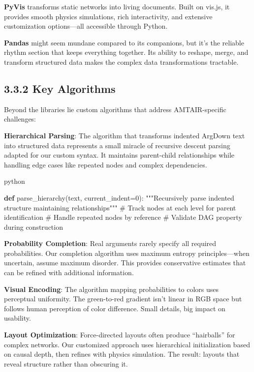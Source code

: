 \documentclass[
  11pt,
  letterpaper,
]{book}
\newenvironment{Shaded}{\begin{snugshade}}{\end{snugshade}}
\newcommand{\CommentTok}[1]{\textcolor[rgb]{0.37,0.37,0.37}{#1}}
\newcommand{\DecValTok}[1]{\textcolor[rgb]{0.68,0.00,0.00}{#1}}
\newcommand{\KeywordTok}[1]{\textcolor[rgb]{0.00,0.23,0.31}{\textbf{#1}}}
\newcommand{\NormalTok}[1]{\textcolor[rgb]{0.00,0.23,0.31}{#1}}
\newcommand{\OperatorTok}[1]{\textcolor[rgb]{0.37,0.37,0.37}{#1}}
\begin{document}
\textbf{PyVis} transforms static networks into living documents. Built
on vis.js, it provides smooth physics simulations, rich interactivity,
and extensive customization options---all accessible through Python.

\textbf{Pandas} might seem mundane compared to its companions, but it's
the reliable rhythm section that keeps everything together. Its ability
to reshape, merge, and transform structured data makes the complex data
transformations tractable.

\subsection{3.3.2 Key Algorithms}\label{sec-key-algorithms}

Beyond the libraries lie custom algorithms that address AMTAIR-specific
challenges:

\textbf{Hierarchical Parsing}: The algorithm that transforms indented
ArgDown text into structured data represents a small miracle of
recursive descent parsing adapted for our custom syntax. It maintains
parent-child relationships while handling edge cases like repeated nodes
and complex dependencies.

python

\begin{Shaded}
\begin{Highlighting}[]
\KeywordTok{def}\NormalTok{ parse\_hierarchy(text, current\_indent}\OperatorTok{=}\DecValTok{0}\NormalTok{):}
    \CommentTok{"""Recursively parse indented structure maintaining relationships"""}
    \CommentTok{\# Track nodes at each level for parent identification}
    \CommentTok{\# Handle repeated nodes by reference}
    \CommentTok{\# Validate DAG property during construction}
\end{Highlighting}
\end{Shaded}

\textbf{Probability Completion}: Real arguments rarely specify all
required probabilities. Our completion algorithm uses maximum entropy
principles---when uncertain, assume maximum disorder. This provides
conservative estimates that can be refined with additional information.

\textbf{Visual Encoding}: The algorithm mapping probabilities to colors
uses perceptual uniformity. The green-to-red gradient isn't linear in
RGB space but follows human perception of color difference. Small
details, big impact on usability.

\textbf{Layout Optimization}: Force-directed layouts often produce
``hairballs'' for complex networks. Our customized approach uses
hierarchical initialization based on causal depth, then refines with
physics simulation. The result: layouts that reveal structure rather
than obscuring it.
\end{document}
